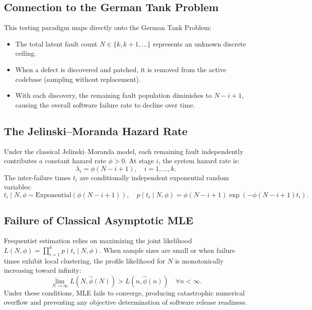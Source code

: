 \documentclass[11pt,a4paper]{article}
\begin{document}
\subsection{Connection to the German Tank Problem}
This testing paradigm maps directly onto the German Tank Problem:
\begin{itemize}
    \item The total latent fault count $N \in \{k, k+1, \dots\}$ represents an unknown discrete ceiling.
    \item When a defect is discovered and patched, it is removed from the active codebase (sampling without replacement).
    \item With each discovery, the remaining fault population diminishes to $N - i + 1$, causing the overall software failure rate to decline over time.
\end{itemize}

\subsection{The Jelinski--Moranda Hazard Rate}
Under the classical Jelinski--Moranda model, each remaining fault independently contributes a constant hazard rate $\phi > 0$. At stage $i$, the system hazard rate is:
\begin{equation}
\lambda_i = \phi (N - i + 1), \quad i = 1, \dots, k.
\end{equation}
The inter-failure times $t_i$ are conditionally independent exponential random variables:
\begin{equation}
t_i \mid N, \phi \sim \text{Exponential}\left( \phi(N - i + 1) \right), \quad p(t_i \mid N, \phi) = \phi (N - i + 1) \exp\left( -\phi(N - i + 1) t_i \right).
\end{equation}

\subsection{Failure of Classical Asymptotic MLE}
Frequentist estimation relies on maximizing the joint likelihood $L(N, \phi) = \prod_{i=1}^k p(t_i \mid N, \phi)$. When sample sizes are small or when failure times exhibit local clustering, the profile likelihood for $N$ is monotonically increasing toward infinity:
\begin{equation}
\lim_{N \to \infty} L(N, \hat{\phi}(N)) > L(n, \hat{\phi}(n)) \quad \forall n < \infty.
\end{equation}
Under these conditions, MLE fails to converge, producing catastrophic numerical overflow and preventing any objective determination of software release readiness.
\end{document}
